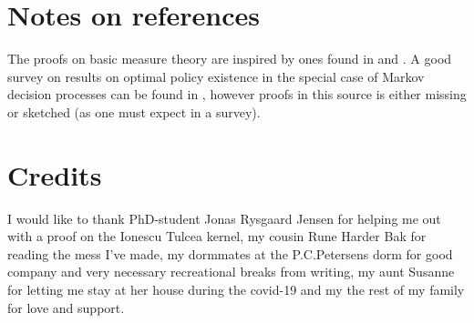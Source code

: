 \section{Notes on references}
The proofs on basic measure theory are inspired by ones found in
 and .
A good survey on results on optimal policy existence in the special case
of Markov decision processes can be found in ,
however proofs in this source is either missing or sketched
(as one must expect in a survey).

\section{Credits}
I would like to thank PhD-student Jonas Rysgaard Jensen for helping me
out with a proof on the Ionescu Tulcea kernel,
my cousin Rune Harder Bak for reading the mess I've made,
my dormmates at the P.C.Petersens dorm for good company and very necessary
recreational breaks from writing,
my aunt Susanne for letting me stay at her house during the covid-19 and
my the rest of my family for love and support.

